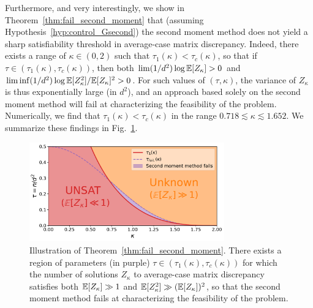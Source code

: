 \myskip
Furthermore, and very interestingly, we show in Theorem~\ref{thm:fail_second_moment} that 
(assuming Hypothesis~\ref{hyp:control_Gsecond}) the second moment method does not yield a sharp satisfiability threshold in average-case matrix discrepancy. 
Indeed, there exists a range of $\kappa \in (0,2)$ such that 
$\tau_1(\kappa) < \tau_{c}(\kappa)$, so that if $\tau \in (\tau_1(\kappa), \tau_c(\kappa))$, 
then both $\lim (1/d^2) \log \mathbb{E}[Z_\kappa] > 0$ and $\liminf (1/d^2) \log \mathbb{E}[Z_\kappa^2]/\mathbb{E}[Z_\kappa]^2 > 0$.
For such values of $(\tau, \kappa)$, the variance of $Z_\kappa$ is thus exponentially large (in $d^2$), and an approach based solely on the second moment method 
will fail at characterizing the feasibility of the problem.
Numerically, we find  that $\tau_1(\kappa) < \tau_c(\kappa)$ in the range $0.718 \lesssim \kappa \lesssim 1.652$. We summarize these findings in Fig.~\ref{fig:fail_second_moment}.
\begin{figure}[!t]
    \centering
    \includegraphics[width=0.75\textwidth]{figures/fail_second_moment.pdf}
    \caption{
        Illustration of Theorem~\ref{thm:fail_second_moment}. There exists a region of parameters (in purple) $\tau \in (\tau_1(\kappa), \tau_c(\kappa))$
        for which the number of solutions $Z_\kappa$ to average-case matrix discrepancy satisfies both $\mathbb{E}[Z_\kappa] \gg 1$ and $\mathbb{E}[Z_\kappa^2] \gg (\mathbb{E}[Z_\kappa])^2$,
        so that the second moment method fails at characterizing the feasibility of the problem.
    \label{fig:fail_second_moment}}
\end{figure}

